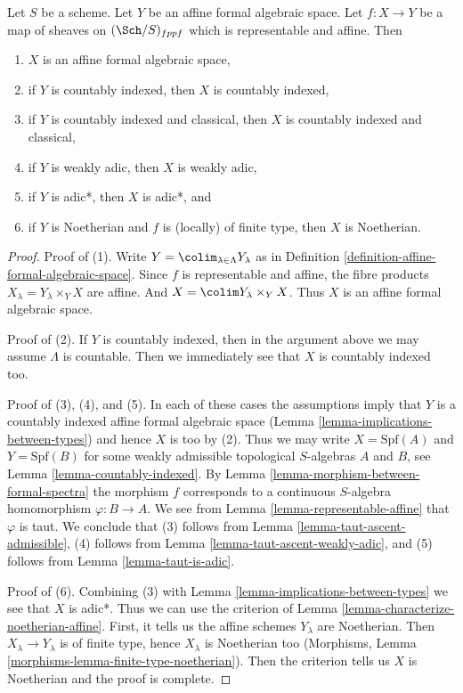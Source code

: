 \begin{lemma}
\label{lemma-property-goes-up-affine-morphism}
Let $S$ be a scheme. Let $Y$ be an affine formal algebraic space.
Let $f : X \to Y$ be a map of sheaves on $(\Sch/S)_{fppf}$ which
is representable and affine. Then
\begin{enumerate}
\item $X$ is an affine formal algebraic space,
\item if $Y$ is countably indexed, then $X$ is countably indexed,
\item if $Y$ is countably indexed and classical, then $X$ is
countably indexed and classical,
\item if $Y$ is weakly adic, then $X$ is weakly adic,
\item if $Y$ is adic*, then $X$ is adic*, and
\item if $Y$ is Noetherian and $f$ is (locally) of finite type, then
$X$ is Noetherian.
\end{enumerate}
\end{lemma}

\begin{proof}
Proof of (1). Write $Y = \colim_{\lambda \in \Lambda} Y_\lambda$ as in
Definition \ref{definition-affine-formal-algebraic-space}.
Since $f$ is representable and affine, the fibre products
$X_\lambda = Y_\lambda \times_Y X$ are affine. And
$X = \colim Y_\lambda \times_Y X$.
Thus $X$ is an affine formal algebraic space.

\medskip\noindent
Proof of (2). If $Y$ is countably indexed, then in the argument above
we may assume $\Lambda$ is countable.
Then we immediately see that $X$ is countably indexed too.

\medskip\noindent
Proof of (3), (4), and (5). In each of these cases the assumptions imply
that $Y$ is a countably indexed affine formal algebraic space
(Lemma \ref{lemma-implications-between-types})
and hence $X$ is too by (2). Thus we may write $X = \text{Spf}(A)$
and $Y = \text{Spf}(B)$ for some weakly admissible topological
$S$-algebras $A$ and $B$, see Lemma \ref{lemma-countably-indexed}.
By Lemma \ref{lemma-morphism-between-formal-spectra}
the morphism $f$ corresponds to a continuous $S$-algebra
homomorphism $\varphi : B \to A$. We see from
Lemma \ref{lemma-representable-affine} that $\varphi$ is taut. We conclude that
(3) follows from Lemma \ref{lemma-taut-ascent-admissible},
(4) follows from Lemma \ref{lemma-taut-ascent-weakly-adic}, and
(5) follows from Lemma \ref{lemma-taut-is-adic}.

\medskip\noindent
Proof of (6). Combining (3) with Lemma \ref{lemma-implications-between-types}
we see that $X$ is adic*. Thus we can use the criterion of
Lemma \ref{lemma-characterize-noetherian-affine}.
First, it tells us the affine schemes $Y_\lambda$ are Noetherian.
Then $X_\lambda \to Y_\lambda$ is of finite type, hence $X_\lambda$
is Noetherian too (Morphisms, Lemma
\ref{morphisms-lemma-finite-type-noetherian}).
Then the criterion tells us $X$ is Noetherian and the proof is
complete.
\end{proof}

